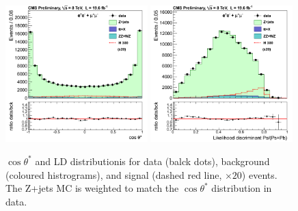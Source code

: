 \begin{figure}[h]
\centering
\includegraphics[width=0.49\textwidth]{plots/h_ll_cts_weighted.png}
\includegraphics[width=0.49\textwidth]{plots/h_ll_ld_weighted.png}
\caption{$\cos\theta^\ast$ and LD distributionis for data (balck dots), background (coloured histrograms), and
signal (dashed red line, $\times 20$) events. The Z+jets MC is weighted to match the $\cos\theta^\ast$
distribution in data.
}
\label{fig:newldplots}
\end{figure}
